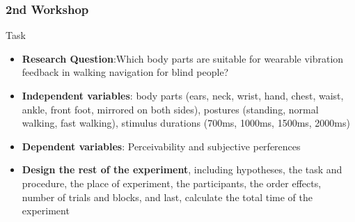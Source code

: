 \documentclass{beamer}
\begin{document}
\begin{frame}
	\frametitle{2nd Workshop}
	\begin{block}{Task}	
	\footnotesize
	\begin{itemize}
	\item \textbf{Research Question}:Which body parts are suitable for wearable vibration feedback in walking navigation for blind people?
	\item \textbf{Independent variables}: body parts (ears, neck, wrist, hand, chest, waist, ankle, front foot, mirrored on both sides), postures (standing, normal walking, fast walking), stimulus durations (700ms, 1000ms, 1500ms, 2000ms)
	\item \textbf{Dependent variables}: Perceivability and subjective perferences
	\item \textbf{Design the rest of the experiment}, including hypotheses, the task and procedure, the place of experiment, the participants, the order effects, number of trials and blocks, and last, calculate the total time of the experiment
	\end{itemize}
	\end{block}
\end{frame}
%
\end{document}
